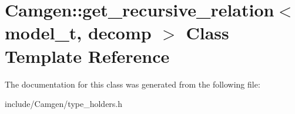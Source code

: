\hypertarget{a00250}{}\section{Camgen\+:\+:get\+\_\+recursive\+\_\+relation$<$ model\+\_\+t, decomp $>$ Class Template Reference}
\label{a00250}


The documentation for this class was generated from the following file\+:\begin{DoxyCompactItemize}
\item 
include/\+Camgen/type\+\_\+holders.\+h\end{DoxyCompactItemize}
